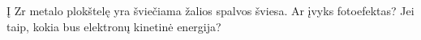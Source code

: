 \question Į Zr metalo plokštelę yra šviečiama žalios spalvos šviesa. Ar įvyks fotoefektas? Jei taip, kokia bus elektronų kinetinė energija?